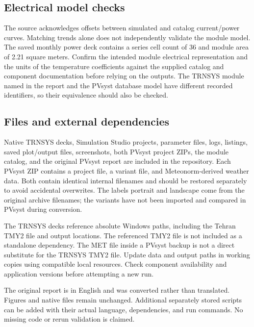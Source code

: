 \documentclass[11pt,a4paper]{article}
\begin{document}
\subsection{Electrical model checks}
The source acknowledges offsets between simulated and catalog current/power curves. Matching trends alone does not independently validate the module model. The saved monthly power deck contains a series cell count of 36 and module area of 2.21 square meters. Confirm the intended module electrical representation and the units of the temperature coefficients against the supplied catalog and component documentation before relying on the outputs. The TRNSYS module named in the report and the PVsyst database model have different recorded identifiers, so their equivalence should also be checked.
\subsection{Files and external dependencies}
Native TRNSYS decks, Simulation Studio projects, parameter files, logs, listings, saved plot/output files, screenshots, both PVsyst project ZIPs, the module catalog, and the original PVsyst report are included in the repository. Each PVsyst ZIP contains a project file, a variant file, and Meteonorm-derived weather data. Both contain identical internal filenames and should be restored separately to avoid accidental overwrites. The labels portrait and landscape come from the original archive filenames; the variants have not been imported and compared in PVsyst during conversion.

The TRNSYS decks reference absolute Windows paths, including the Tehran TMY2 file and output locations. The referenced TMY2 file is not included as a standalone dependency. The MET file inside a PVsyst backup is not a direct substitute for the TRNSYS TMY2 file. Update data and output paths in working copies using compatible local resources. Check component availability and application versions before attempting a new run.

The original report is in English and was converted rather than translated. Figures and native files remain unchanged. Additional separately stored scripts can be added with their actual language, dependencies, and run commands. No missing code or rerun validation is claimed.
\end{document}
